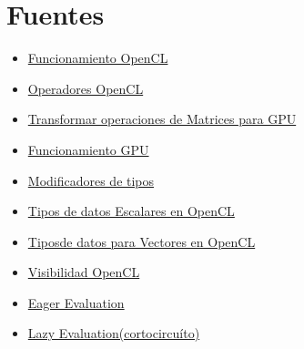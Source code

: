 \documentclass[12pt,a4paper]{article}
\begin{document}
\section{Fuentes}
\begin{itemize}
\item \href{https://www.khronos.org/assets/uploads/developers/library/overview/opencl_overview.pdf}{ Funcionamiento OpenCL}
\item \href{https://www.khronos.org/registry/cl/sdk/2.0/docs/man/xhtml/operators.html}{Operadores OpenCL}
\item \href{http://gpgpu-computing4.blogspot.com.es/2009/09/matrix-multiplication-2-opencl.html}{Transformar operaciones de Matrices para GPU}
\item \href{https://www.khronos.org/assets/uploads/developers/library/overview/opencl_overview.pdf#page=8}{Funcionamiento GPU}
\item \href{https://www.khronos.org/registry/cl/specs/opencl-2.0-openclc.pdf#page=51}{Modificadores de tipos}
\item \href{https://www.khronos.org/registry/cl/specs/opencl-2.0-openclc.pdf#page=6}{Tipos de datos Escalares en OpenCL}
\item \href{https://www.khronos.org/registry/cl/specs/opencl-2.0-openclc.pdf#page=9}{Tiposde datos para Vectores en OpenCL}
\item \href{https://www.khronos.org/registry/cl/specs/opencl-2.0-openclc.pdf#page=50}{Visibilidad OpenCL}
\item \href{http://en.wikipedia.org/wiki/Eager_evaluation}{Eager Evaluation}
\item \href{http://en.wikipedia.org/wiki/Lazy_evaluation}{Lazy Evaluation(cortocircuíto)}
\end{itemize}
\end{document}
